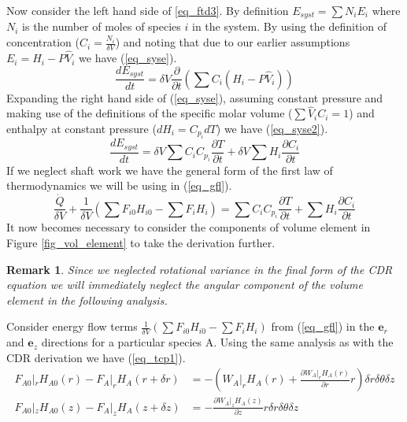 \documentclass[11pt,fleqn]{article}
\theoremstyle{defstyle}
\newtheorem{rmrk}{Remark}[section]
\begin{document}
Now consider the left hand side of \ref{eq_ftd3}. By definition $E_{syst} = \sum N_iE_i$ where $N_i$ is the number of moles of species $i$ in the system. By using the definition of concentration ($C_i = \frac{N_i}{\delta V}$) and noting that due to our earlier assumptions $E_i = H_i - P\hat{V}_i$  we have (\ref{eq_syse}).
\begin{equation}
\frac{d E_{syst}}{dt} = \delta V \frac{\partial}{\partial t}\left(\sum C_i (H_i - P\hat{V}_i)\right)
\label{eq_syse}
\end{equation}
Expanding the right hand side of (\ref{eq_syse}), assuming constant pressure and making use of the definitions of the specific molar volume ($\sum \hat{V}_iC_i = 1$) and enthalpy at constant pressure ($dH_i = C_{p_i}dT$) we have (\ref{eq_syse2}).
\begin{equation}
\frac{d E_{syst}}{dt} = \delta V \sum C_i C_{p_i} \frac{\partial T}{\partial t} + \delta V \sum H_i \frac{\partial C_i}{\partial t} 
\label{eq_syse2}
\end{equation}
If we neglect shaft work we have the general form of the first law of thermodynamics we will be using in (\ref{eq_gfl}).  
\begin{equation}
\frac{\dot{Q}}{\delta V} + \frac{1}{\delta V}\left(\sum F_{i0}H_{i0} -\sum F_{i}H_{i}\right) =\sum C_i C_{p_i} \frac{\partial T}{\partial t} + \sum H_i \frac{\partial C_i}{\partial t}
\label{eq_gfl}
\end{equation}
It now becomes necessary to consider the components of volume element  in Figure \ref{fig_vol_element} to take the derivation further.
\begin{rmrk}
Since we neglected rotational variance in the final form of the CDR equation we will immediately neglect the angular component of the volume element in the following analysis.  
\end{rmrk}
Consider energy flow terms $\frac{1}{\delta V}\left(\sum F_{i0}H_{i0} -\sum F_{i}H_{i}\right)$ from (\ref{eq_gfl}) in the $\mathbf{e}_r$ and $\mathbf{e}_z$ directions for a particular species A. Using the same analysis as with the CDR derivation we have (\ref{eq_tcp1}).
\begin{equation}
\begin{aligned}
F_{A0}|_r H_{A0}(r) - F_{A}|_rH_{A}(r+\delta r) &= -\left(W_A|_r H_A(r) + \frac{\partial W_A|_r H_A(r)}{\partial r}r\right)\delta r \delta \theta \delta z \\
F_{A0}|_z H_{A0}(z) - F_{A}|_z H_{A}(z+\delta z) &= -\frac{\partial W_A|_z H_A(z)}{\partial z}r \delta r \delta \theta \delta z   
\end{aligned}
\label{eq_tcp1}
\end{equation}
\end{document}
